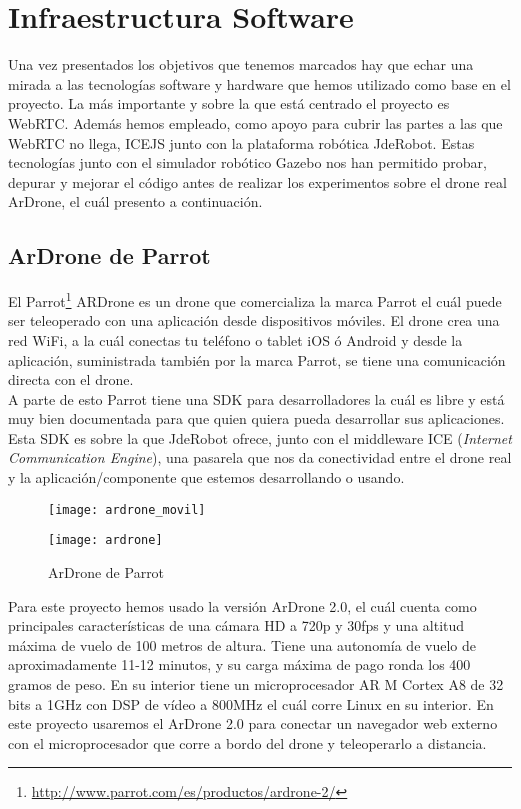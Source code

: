 \chapter{Infraestructura Software} 

Una vez presentados los objetivos que tenemos marcados hay que echar una mirada a las tecnologías software y hardware que hemos utilizado como base en el proyecto. La más importante y sobre la que está centrado el proyecto es WebRTC. Además hemos empleado, como apoyo para cubrir las partes a las que WebRTC no llega, ICEJS junto con la plataforma robótica JdeRobot. Estas tecnologías junto con el simulador robótico Gazebo nos han permitido probar, depurar y mejorar el código antes de realizar los experimentos sobre el drone real ArDrone, el cuál presento a continuación.\\


\section{ArDrone de Parrot}

El Parrot\footnote{\url{http://www.parrot.com/es/productos/ardrone-2/}} ARDrone es un drone que comercializa la marca Parrot el cuál puede ser teleoperado con una aplicación desde dispositivos móviles. El drone crea una red WiFi, a la cuál conectas tu teléfono o tablet iOS ó Android y desde la aplicación, suministrada también por la marca Parrot,  se tiene una comunicación directa con el drone.\\

A parte de esto Parrot tiene una SDK para desarrolladores la cuál es libre y está muy bien documentada para que quien quiera pueda desarrollar sus aplicaciones. Esta SDK es sobre la que JdeRobot ofrece, junto con el middleware ICE (\emph{Internet Communication Engine}), una pasarela que nos da conectividad entre el drone real y la aplicación/componente que estemos desarrollando o usando.\\

\begin{figure}[h!]
\centering
\texttt{[image: ardrone\_movil]}
\end{figure}

\begin{figure}[h!]
\centering
\texttt{[image: ardrone]}
\caption{ArDrone de Parrot}
\label{fig:ardrone}
\end{figure}

Para este proyecto hemos usado la versión ArDrone 2.0, el cuál cuenta como principales características de una cámara HD a 720p y 30fps y una altitud máxima de vuelo de 100 metros de altura. Tiene una autonomía de vuelo de aproximadamente 11-12 minutos, y su carga máxima de pago ronda los 400 gramos de peso. En su interior tiene un microprocesador AR M Cortex A8 de 32 bits a 1GHz con DSP de vídeo a 800MHz el cuál corre Linux en su interior. En este proyecto usaremos el ArDrone 2.0 para conectar un navegador web externo con el microprocesador que corre a bordo del drone y teleoperarlo a distancia.\\

